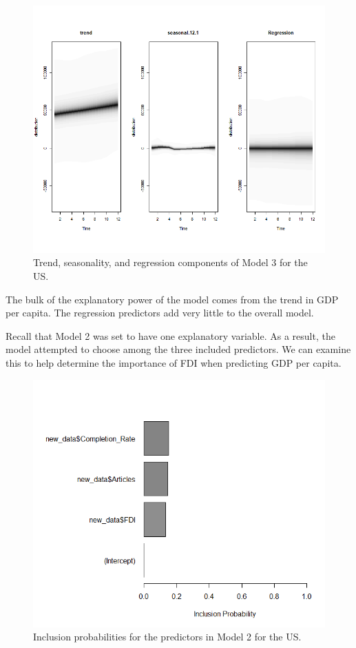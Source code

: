 \documentclass{article}
\begin{document}
\begin{figure}[H]
	\centering
	\includegraphics[width=\linewidth]{US_comp.png}
	\caption{Trend, seasonality, and regression components of Model 3 for the US.}
	\label{fig:pairs}
\end{figure}

The bulk of the explanatory power of the model comes from the trend in GDP per capita. The regression predictors add very little to the overall model.

Recall that Model 2 was set to have one explanatory variable. As a result, the model attempted to choose among the three included predictors. We can examine this to help determine the importance of FDI when predicting GDP per capita.

\begin{figure}[H]
	\centering
	\includegraphics[width=\linewidth]{US_Model2_coef.png}
	\caption{Inclusion probabilities for the predictors in Model 2 for the US.}
	\label{fig:pairs}
\end{figure}
\end{document}
